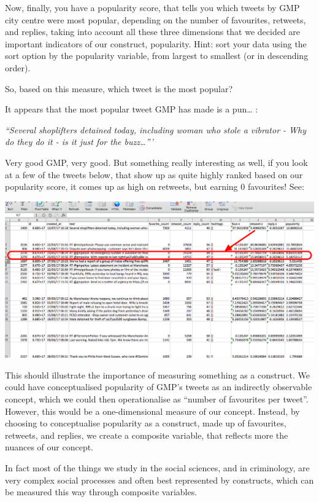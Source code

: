 \documentclass[]{book}
\theoremstyle{definition}
\theoremstyle{definition}
\theoremstyle{definition}
\theoremstyle{remark}
\begin{document}
Now, finally, you have a popularity score, that tells you which tweets
by GMP city centre were most popular, depending on the number of
favourites, retweets, and replies, taking into account all these three
dimensions that we decided are important indicators of our construct,
popularity. Hint: sort your data using the sort option by the popularity
variable, from largest to smallest (or in descending order).

So, based on this measure, which tweet is the most popular?

It appears that the most popular tweet GMP has made is a pun\ldots{} :

\emph{``Several shoplifters detained today, including woman who stole a
vibrator - Why do they do it - is it just for the buzz\ldots{}'''}

Very good GMP, very good. But something really interesting as well, if
you look at a few of the tweets below, that show up as quite highly
ranked based on our popularity score, it comes up as high on retweets,
but earning 0 favourites! See:

\includegraphics{imgs/low_fave_high_rt.png}

This should illustrate the importance of measuring something as a
construct. We could have conceptualised popularity of GMP's tweets as an
indirectly observable concept, which we could then operationalise as
``number of favourites per tweet''. However, this would be a
one-dimensional measure of our concept. Instead, by choosing to
conceptualise popularity as a construct, made up of favourites,
retweets, and replies, we create a composite variable, that reflects
more the nuances of our concept.

In fact most of the things we study in the social sciences, and in
criminology, are very complex social processes and often best
represented by constructs, which can be measured this way through
composite variables.
\end{document}
